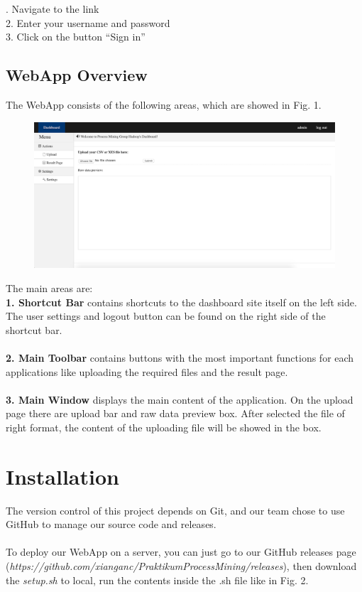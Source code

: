 \documentclass[runningheads]{llncs}
\begin{document}
. Navigate to the link\\
2. Enter your username and password\\
3. Click on the button “Sign in”\\

\subsection{WebApp Overview}
The WebApp consists of the following areas, which are showed in Fig. 1.\\

\begin{figure}[h]	
	\centering
	\includegraphics[scale=0.24]{dashboard.png}
	\caption{}
	\label{fig:label}
\end{figure}
\noindent
The main areas are:\\

\noindent
\textbf{1. Shortcut Bar} contains shortcuts to the dashboard site itself on the left side. The user settings and logout button can be found on the right side of the shortcut bar.\\\\
\noindent
\textbf{2. Main Toolbar} contains buttons with the most important functions for each applications like uploading the required files and the result page.\\\\
\noindent
\textbf{3. Main Window} displays the main content of the application. On the upload page there are upload bar and raw data preview box. After selected the file of right format, the content of the uploading file will be showed in the box.

\section{Installation}
The version control of this project depends on Git, and our team chose to use GitHub to manage our source code and releases.\\\\
\noindent
To deploy our WebApp on a server, you can just go to our GitHub releases page (\textit{https://github.com/xianganc/PraktikumProcessMining/releases}), then download the \textit{setup.sh} to local, run the contents inside the .sh file like in Fig. 2.
\end{document}
